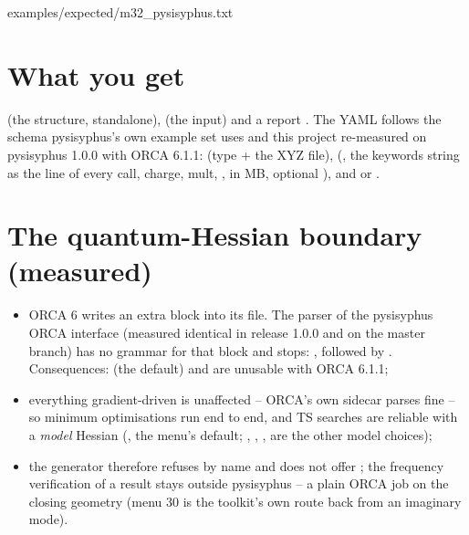 
  {examples/expected/m32_pysisyphus.txt}

\section{What you get}

 (the structure, standalone), 
(the input) and a report .  The YAML follows the
schema pysisyphus's own example set uses and this project re-measured on
pysisyphus 1.0.0 with ORCA 6.1.1:  (type + the XYZ file),
 (, the keywords string as the \code{!} line of every
call, charge, mult, ,  in MB, optional ), and
 or .

\section{The quantum-Hessian boundary (measured)}

\begin{readbox}
\begin{itemize}
  \item ORCA 6 writes an extra  block into its
     file.  The parser of the pysisyphus ORCA interface (measured
    identical in release 1.0.0 and on the master branch) has no grammar for
    that block and stops: ,
    followed by .  Consequences:
     (the  default) and
     are unusable with ORCA 6.1.1;
  \item everything gradient-driven is unaffected -- ORCA's own 
    sidecar parses fine -- so minimum optimisations run end to end, and TS
    searches are reliable with a \emph{model} Hessian
    (, the menu's default; ,
    , ,  are the other model choices);
  \item the generator therefore refuses  by name and does not offer
    ; the frequency verification of a result stays outside
    pysisyphus -- a plain ORCA  job on the closing geometry
    (menu 30 is the toolkit's own route back from an imaginary mode).
\end{itemize}
\end{readbox}

